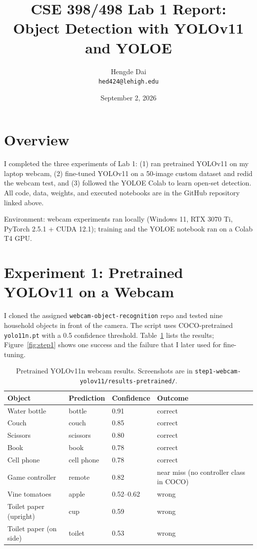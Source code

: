 \documentclass[11pt]{article}
\title{CSE 398/498 Lab 1 Report:\\Object Detection with YOLOv11 and YOLOE}
\author{Hengde Dai \\ \texttt{hed424@lehigh.edu}}
\date{September 2, 2026}
\begin{document}
\maketitle

\begin{center}
\end{center}

\section{Overview}

I completed the three experiments of Lab 1: (1) ran pretrained YOLOv11 on my laptop webcam, (2) fine-tuned YOLOv11 on a 50-image custom dataset and redid the webcam test, and (3) followed the YOLOE Colab to learn open-set detection. All code, data, weights, and executed notebooks are in the GitHub repository linked above.

Environment: webcam experiments ran locally (Windows 11, RTX 3070 Ti, PyTorch 2.5.1 + CUDA 12.1); training and the YOLOE notebook ran on a Colab T4 GPU.

\section{Experiment 1: Pretrained YOLOv11 on a Webcam}

I cloned the assigned \texttt{webcam-object-recognition} repo and tested nine household objects in front of the camera. The script uses COCO-pretrained \texttt{yolo11n.pt} with a 0.5 confidence threshold. Table~\ref{tab:step1} lists the results; Figure~\ref{fig:step1} shows one success and the failure that I later used for fine-tuning.

\begin{table}[h]
\centering
\small
\begin{tabular}{llll}
\toprule
Object & Prediction & Confidence & Outcome \\
\midrule
Water bottle & bottle & 0.91 & correct \\
Couch & couch & 0.85 & correct \\
Scissors & scissors & 0.80 & correct \\
Book & book & 0.78 & correct \\
Cell phone & cell phone & 0.78 & correct \\
Game controller & remote & 0.82 & near miss (no controller class in COCO) \\
\midrule
Vine tomatoes & apple & 0.52--0.62 & wrong \\
Toilet paper (upright) & cup & 0.59 & wrong \\
Toilet paper (on side) & toilet & 0.53 & wrong \\
\bottomrule
\end{tabular}
\caption{Pretrained YOLOv11n webcam results. Screenshots are in \texttt{step1-webcam-yolov11/results-pretrained/}.}
\label{tab:step1}
\end{table}
\end{document}
